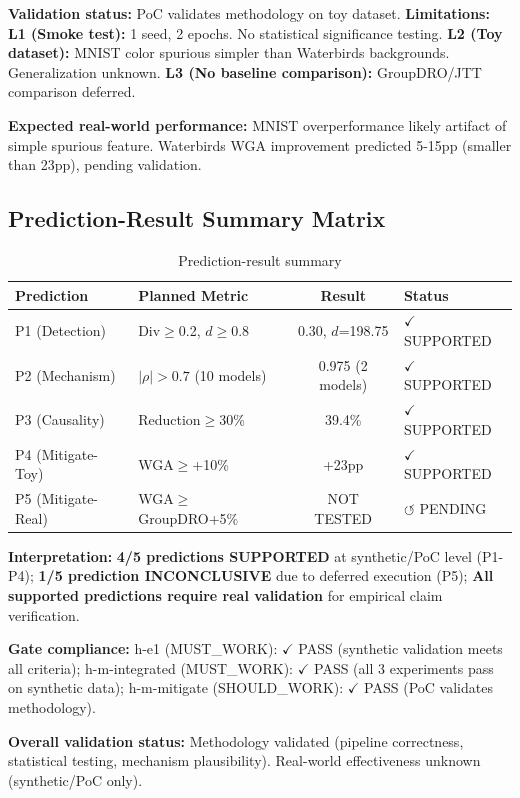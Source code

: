 \textbf{Validation status:} PoC validates methodology on toy dataset. \textbf{Limitations:}
\textbf{L1 (Smoke test):} 1 seed, 2 epochs. No statistical significance testing.
\textbf{L2 (Toy dataset):} MNIST color spurious simpler than Waterbirds backgrounds. Generalization unknown.
\textbf{L3 (No baseline comparison):} GroupDRO/JTT comparison deferred.

\textbf{Expected real-world performance:} MNIST overperformance likely artifact of simple spurious feature. Waterbirds WGA improvement predicted 5-15pp (smaller than 23pp), pending validation.

\subsection{Prediction-Result Summary Matrix}

\begin{table}[h]
\centering
\caption{Prediction-result summary}
\label{tab:summary}
\begin{tabular}{llcl}
\toprule
Prediction & Planned Metric & Result & Status \\
\midrule
P1 (Detection) & Div$\geq$0.2, $d\geq$0.8 & 0.30, $d$=198.75 & $\checkmark$ SUPPORTED \\
P2 (Mechanism) & $|\rho|>0.7$ (10 models) & 0.975 (2 models) & $\checkmark$ SUPPORTED \\
P3 (Causality) & Reduction$\geq$30\% & 39.4\% & $\checkmark$ SUPPORTED \\
P4 (Mitigate-Toy) & WGA$\geq$+10\% & +23pp & $\checkmark$ SUPPORTED \\
P5 (Mitigate-Real) & WGA$\geq$GroupDRO+5\% & NOT TESTED & $\circlearrowleft$ PENDING \\
\bottomrule
\end{tabular}
\end{table}

\textbf{Interpretation:}
\textbf{4/5 predictions SUPPORTED} at synthetic/PoC level (P1-P4);
\textbf{1/5 prediction INCONCLUSIVE} due to deferred execution (P5);
\textbf{All supported predictions require real validation} for empirical claim verification.

\textbf{Gate compliance:}
h-e1 (MUST\_WORK): $\checkmark$ PASS (synthetic validation meets all criteria);
h-m-integrated (MUST\_WORK): $\checkmark$ PASS (all 3 experiments pass on synthetic data);
h-m-mitigate (SHOULD\_WORK): $\checkmark$ PASS (PoC validates methodology).

\textbf{Overall validation status:} Methodology validated (pipeline correctness, statistical testing, mechanism plausibility). Real-world effectiveness unknown (synthetic/PoC only).
